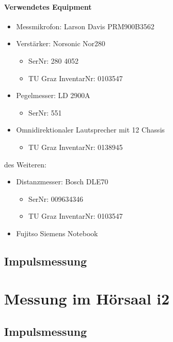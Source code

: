 \documentclass[11pt]{report}
\begin{document}
\paragraph{Verwendetes Equipment}
\begin{itemize}
\item Messmikrofon: Larson Davis PRM900B3562
\item Verstärker: Norsonic Nor280
\begin{itemize}
\item SerNr: 280 4052
\item TU Graz InventarNr: 0103547
\end{itemize}
\item Pegelmesser: LD 2900A
\begin{itemize}
\item SerNr: 551
\end{itemize}
\item Omnidirektionaler Lautsprecher mit 12 Chassis
\begin{itemize}
\item TU Graz InventarNr: 0138945
\end{itemize}
\end{itemize}
des Weiteren:
\begin{itemize}
\item Distanzmesser: Bosch DLE70
\begin{itemize}
\item SerNr: 009634346
\item TU Graz InventarNr: 0103547
\end{itemize}
\item Fujitso Siemens Notebook
\end{itemize}
\subsection{Impulsmessung}
\section{Messung im Hörsaal i2}
\subsection{Impulsmessung}


\end{document}
